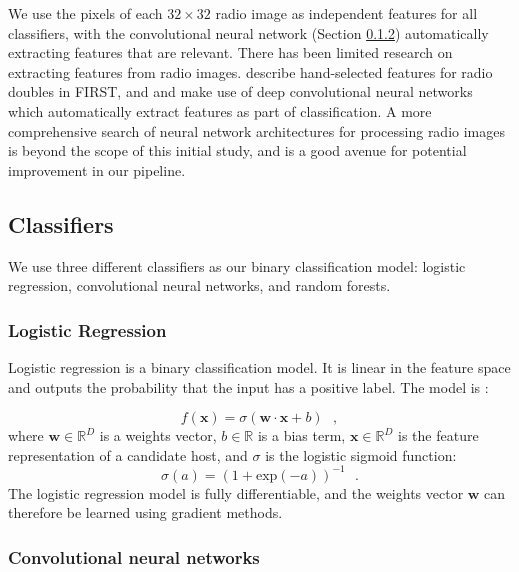 \documentclass[fleqn,usenatbib,usedcolumn]{mnras}
\renewcommand{\vec}[1]{\mathbf{#1}}
\begin{document}
    We use the pixels of each $32 \times 32$ radio image as
    independent features for all classifiers, with the convolutional neural
    network (Section \ref{sec:convolutional-neural-networks}) automatically
    extracting features that are relevant.
    There has been limited research on extracting features from radio images.
    \citet{proctor06} describe hand-selected features for radio doubles in
    FIRST, and \citet{aniyan17cnn} and \citet{lukic17compact} make use of deep
    convolutional neural networks which automatically extract features as part
    of classification. A more comprehensive search of neural network architectures
    for processing radio images is beyond the scope of this initial study,
    and is a good avenue for potential improvement in our pipeline.

  \subsection{Classifiers}\label{sec:classifiers}

    We use three different classifiers as our binary classification model:
    logistic regression, convolutional neural networks, and random forests.

    \subsubsection{Logistic Regression}
    \label{sec:logistic-regression}
      Logistic regression is a binary classification model. It is linear in the
      feature space and outputs the probability that the input has a positive
      label. The model is \citep{bishop06ml}:

      \begin{equation}
          f(\vec x) = \sigma(\vec w \cdot \vec x + b) \,\,\,\,,
      \end{equation}
      where $\vec w \in \mathbb{R}^D$ is a weights vector,
      $b \in \mathbb{R}$ is a bias term, $\vec x \in \mathbb{R}^D$ is the
      feature representation of a candidate host, and $\sigma$ is the
      logistic sigmoid function: \begin{equation}
          \sigma(a) = (1 + \mathrm{exp}(-a))^{-1}\,\,\,\,.
      \end{equation}%
      The logistic regression model is fully differentiable, and the weights
      vector $\vec w$ can therefore be learned using gradient methods.

    \subsubsection{Convolutional neural networks}
    \label{sec:convolutional-neural-networks}
\end{document}
